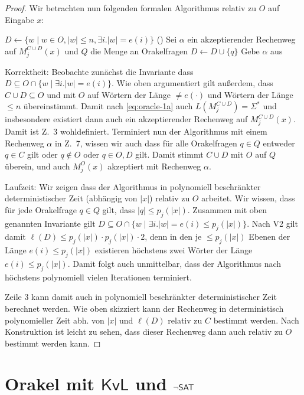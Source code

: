 \begin{proof}
    Wir betrachten nun folgenden formalen Algorithmus relativ zu $O$ auf Eingabe $x$:\\
    \begin{algorithm}[H]
        $D\gets \{ w\mid w\in O, |w|\leq n, \exists i.|w|=e(i)\}$ 
        \Loop(){}
        {
            Sei $\alpha$ ein akzeptierender Rechenweg auf $M_j^{C\cup D}(x)$ und $Q$ die Menge an Orakelfragen\;
            {
                $D\gets D \cup \{q\}$\;
            }
            {
                Gebe {$\alpha$} aus\;
            }
        }
    \end{algorithm}

    Korrektheit: Beobachte zunächst die Invariante dass $D\subseteq O\cap \{ w \mid \exists i.|w|=e(i)\}$.
    Wie oben argumentiert gilt außerdem, dass $C\cup D\subseteq O$ und mit $O$ auf Wörtern der Länge $\neq e(\cdot)$ und Wörtern der Länge $\leq n$ übereinstimmt. Damit nach \eqref{eq:oracle-1a} auch $L(M_j^{C\cup D})=\Sigma^*$ und insbesondere existiert dann auch ein akzeptierender Rechenweg auf $M_j^{C\cup D}(x)$. Damit ist Z.~3 wohldefiniert.
    Terminiert nun der Algorithmus mit einem Rechenweg $\alpha$ in Z.~7, wissen wir auch dass für alle Orakelfragen $q\in Q$ entweder $q\in C$ gilt oder $q\not\in O$ oder $q\in O, D$ gilt.
    Damit stimmt $C\cup D$ mit $O$ auf $Q$ überein, und auch $M_j^O(x)$ akzeptiert mit Rechenweg $\alpha$.

    Laufzeit: Wir zeigen dass der Algorithmus in polynomiell beschränkter deterministischer Zeit (abhängig von $|x|$) relativ zu $O$ arbeitet. 
    Wir wissen, dass für jede Orakelfrage $q\in Q$ gilt, dass $|q|\leq p_j(|x|)$.
    Zusammen mit oben genannten Invariante gilt $D\subseteq O\cap \{w \mid \exists i.|w|=e(i)\leq p_j(|x|)\}$.
    Nach V2 gilt damit $\ell(D)\leq p_j(|x|)\cdot p_j(|x|)\cdot 2$, denn in den je $\leq p_j(|x|)$ Ebenen der Länge $e(i)\leq p_j(|x|)$ existieren höchstens zwei Wörter der Länge $e(i)\leq p_j(|x|)$.
    Damit folgt auch unmittelbar, dass der Algorithmus nach höchstens polynomiell vielen Iterationen terminiert.

    Zeile 3 kann damit auch in polynomiell beschränkter deterministischer Zeit berechnet werden. Wie oben skizziert kann der Rechenweg in deterministisch polynomieller Zeit abh. von $|x|$ und $\ell(D)$ relativ zu $C$ bestimmt werden.
    Nach Konstruktion ist leicht zu sehen, dass dieser Rechenweg dann auch relativ zu $O$ bestimmt werden kann.
\end{proof}


\section{Orakel mit $\mathsf{KvL}$ und $\neg\mathsf{SAT}$}





